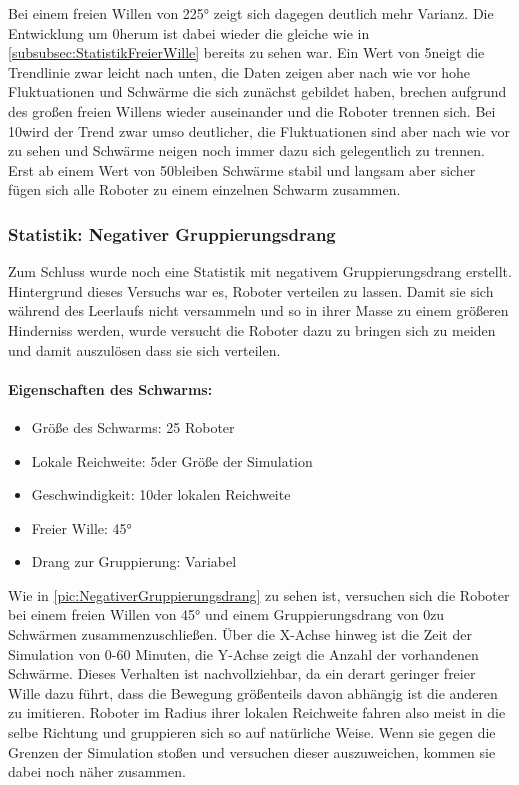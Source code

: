 Bei einem freien Willen von 225° zeigt sich dagegen deutlich mehr Varianz. Die Entwicklung um 0\per herum ist dabei wieder die gleiche wie in \autoref{subsubsec:StatistikFreierWille} bereits zu sehen war. Ein Wert von 5\per neigt die Trendlinie zwar leicht nach unten, die Daten zeigen aber nach wie vor hohe Fluktuationen und Schwärme die sich zunächst gebildet haben, brechen aufgrund des großen freien Willens wieder auseinander und die Roboter trennen sich. Bei 10\per wird der Trend zwar umso deutlicher, die Fluktuationen sind aber nach wie vor zu sehen und Schwärme neigen noch immer dazu sich gelegentlich zu trennen. Erst ab einem Wert von 50\per bleiben Schwärme stabil und langsam aber sicher fügen sich alle Roboter zu einem einzelnen Schwarm zusammen.

\subsubsection*{Statistik: Negativer Gruppierungsdrang}

Zum Schluss wurde noch eine Statistik mit negativem Gruppierungsdrang erstellt. Hintergrund dieses Versuchs war es, Roboter verteilen zu lassen. Damit sie sich während des Leerlaufs nicht versammeln und so in ihrer Masse zu einem größeren Hinderniss werden, wurde versucht die Roboter dazu zu bringen sich zu meiden und damit auszulösen dass sie sich verteilen.

\paragraph*{Eigenschaften des Schwarms:}
\begin{itemize}
	\item Größe des Schwarms: 25 Roboter
	\item Lokale Reichweite: 5\per der Größe der Simulation
	\item Geschwindigkeit: 10\per der lokalen Reichweite
	\item Freier Wille: 45°
	\item Drang zur Gruppierung: Variabel
\end{itemize}

Wie in \autoref{pic:NegativerGruppierungsdrang} zu sehen ist, versuchen sich die Roboter bei einem  freien Willen von 45° und einem Gruppierungsdrang von 0\per zu Schwärmen zusammenzuschließen. Über die X-Achse hinweg ist die Zeit der Simulation von 0-60 Minuten, die Y-Achse zeigt die Anzahl der vorhandenen Schwärme. Dieses Verhalten ist nachvollziehbar, da ein derart geringer freier Wille dazu führt, dass die Bewegung größenteils davon abhängig ist die anderen zu imitieren. Roboter im Radius ihrer lokalen Reichweite fahren also meist in die selbe Richtung und gruppieren sich so auf natürliche Weise. Wenn sie gegen die Grenzen der Simulation stoßen und versuchen dieser auszuweichen, kommen sie dabei noch näher zusammen.

